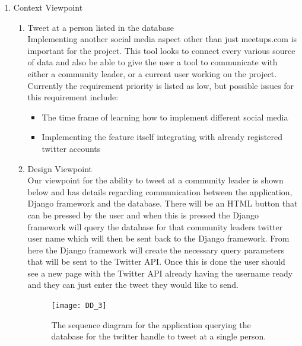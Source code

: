\documentclass[draftclsnofoot,10pt,onecolumn]{IEEEtran} %
\begin{document}
\begin{enumerate}
\begin{enumerate}
		\item Context Viewpoint \\
			\begin{enumerate}
				\item Tweet at a person listed in the database \\
				Implementing another social media aspect other than just meetups.com is important for the project. This
				tool looks to connect every various source of data and also be able to give the user a tool to communicate
				with either a community leader, or a current user working on the project. Currently the requirement priority
				is listed as low, but possible issues for this requirement include:
				\begin{itemize}
					\item The time frame of learning how to implement different social media
					\item Implementing the feature itself integrating with already registered twitter accounts \\
				\end{itemize}
				
				\item Design Viewpoint \\%
				Our viewpoint for the ability to tweet at a community leader is shown below and has details regarding
				communication between the application, Django framework and the database. There will be an HTML
				button that can be pressed by the user and when this is pressed the Django framework will query the
				database for that community leaders twitter user name which will then be sent back to the Django
				framework. From here the Django framework will create the necessary query parameters that will be sent to
				the Twitter API. Once this is done the user should see a new page with the Twitter API already having the
				username ready and they can just enter the tweet they would like to send. \\
				
				\begin{figure}[H]
  					\begin{center}
						\texttt{[image: DD\_3]}
						\captionsetup{width=.4\linewidth}
						\centering
  						\caption{The sequence diagram for the application querying the database for the twitter handle to 
  						tweet at a single person.}
  					\end{center}
				\end{figure}
				

\end{enumerate}
\end{enumerate}
\end{enumerate}
\end{document}
